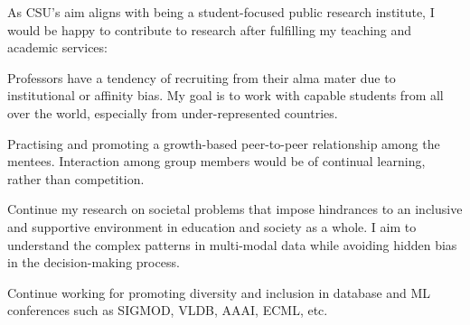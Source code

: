 %
As CSU's aim aligns with being a student-focused public research institute, I would be happy to contribute to research after fulfilling my teaching and academic services: 
\begin{enumerate*}[leftmargin=*, noitemsep, topsep=0pt, label=(\arabic*)]
    \item Professors have a tendency of recruiting from their alma mater due to institutional or affinity bias. My goal is to work with capable students from all over the world, especially from under-represented countries.
    \item Practising and promoting a growth-based peer-to-peer relationship among the mentees. Interaction among group members would be of continual learning, rather than competition. %
    \item Continue my research on societal problems that impose hindrances to an inclusive and supportive environment in education and society as a whole. I aim to understand the complex patterns in multi-modal data while avoiding hidden bias in the decision-making process. 
    \item Continue working for promoting diversity and inclusion in database and ML conferences such as SIGMOD, VLDB, AAAI, ECML, etc.
\end{enumerate*}
